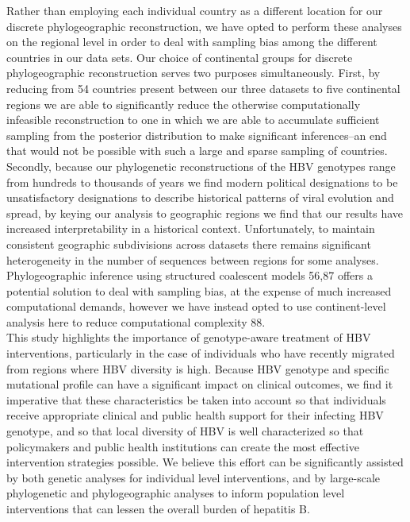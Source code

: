 Rather than employing each individual country as a different location for our discrete phylogeographic reconstruction, we have opted to perform these analyses on the regional level in order to deal with sampling bias among the different countries in our data sets. Our choice of continental groups for discrete phylogeographic reconstruction serves two purposes simultaneously. First, by reducing from 54 countries present between our three datasets to five continental regions we are able to significantly reduce the otherwise computationally infeasible reconstruction to one in which we are able to accumulate sufficient sampling from the posterior distribution to make significant inferences–an end that would not be possible with such a large and sparse sampling of countries. Secondly, because our phylogenetic reconstructions of the HBV genotypes range from hundreds to thousands of years we find modern political designations to be unsatisfactory designations to describe historical patterns of viral evolution and spread, by keying our analysis to geographic regions we find that our results have increased interpretability in a historical context.   Unfortunately, to maintain consistent geographic subdivisions across datasets there remains significant heterogeneity in the number of sequences between regions for some analyses. Phylogeographic inference using structured coalescent models 56,87 offers a potential solution to deal with sampling bias, at the expense of much increased computational demands, however we have instead opted to use continent-level analysis here to reduce computational complexity  88.\\

This study highlights the importance of genotype-aware treatment of HBV interventions, particularly in the case of individuals who have recently migrated from regions where HBV diversity is high. Because HBV genotype and specific mutational profile can have a significant impact on clinical outcomes, we find it imperative that these characteristics be taken into account so that individuals receive appropriate clinical and public health support for their infecting HBV genotype, and so that local diversity of HBV is well characterized so that policymakers and public health institutions can create the most effective intervention strategies possible. We believe this effort can be significantly assisted by both genetic analyses for individual level interventions, and by large-scale phylogenetic and phylogeographic analyses to inform population level interventions that can lessen the overall burden of hepatitis B.

